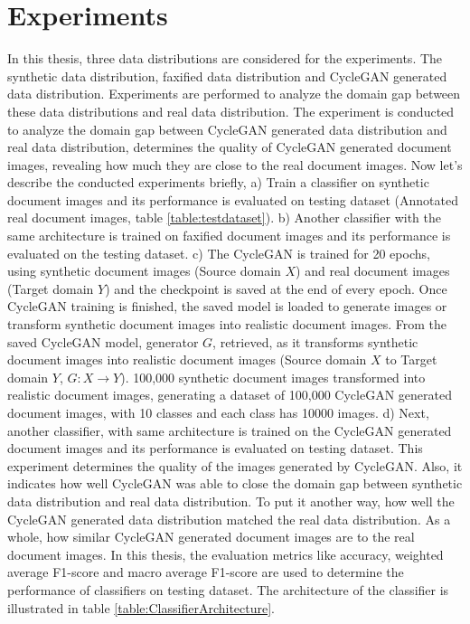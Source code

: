 

\section{Experiments}\label{experiments}

In this thesis, three data distributions are considered for the experiments. The synthetic data distribution, faxified data distribution and \ac{CycleGAN} generated data distribution. Experiments are performed to analyze the domain gap between these data distributions and real data distribution. The experiment is conducted to analyze the domain gap between \ac{CycleGAN} generated data distribution and real data distribution, determines the quality of \ac{CycleGAN} generated document images, revealing how much they are close to the real document images. Now let's describe the conducted experiments briefly, a) Train a classifier on synthetic document images and its performance is evaluated on testing dataset (Annotated real document images, table \ref{table:testdataset}). b) Another classifier with the same architecture is trained on faxified document images and its performance is evaluated on the testing dataset. c) The \ac{CycleGAN} is trained for 20 epochs, using synthetic document images (Source domain $X$) and real document images (Target domain $Y$) and the checkpoint is saved at the end of every epoch. Once \ac{CycleGAN} training is finished, the saved model is loaded to generate images or transform synthetic document images into realistic document images. From the saved \ac{CycleGAN} model, generator $G$, retrieved, as it transforms synthetic document images into realistic document images (Source domain $X$ to Target domain $Y$, $G: X \rightarrow Y$). 100,000 synthetic document images transformed into realistic document images, generating a dataset of 100,000 \ac{CycleGAN} generated document images, with 10 classes and each class has 10000 images. d) Next, another classifier, with same architecture is trained on the \ac{CycleGAN} generated document images and its performance is evaluated on testing dataset. This experiment determines the quality of the images generated by \ac{CycleGAN}. Also, it indicates how well \ac{CycleGAN} was able to close the domain gap between synthetic data distribution and real data distribution. To put it another way, how well the \ac{CycleGAN} generated data distribution matched the real data distribution. As a whole, how similar \ac{CycleGAN} generated document images are to the real document images. In this thesis, the evaluation metrics like accuracy, weighted average F1-score and macro average F1-score \cite{lipton2014thresholding} are used to determine the performance of classifiers on testing dataset. The architecture of the classifier is illustrated in table \ref{table:ClassifierArchitecture}.



